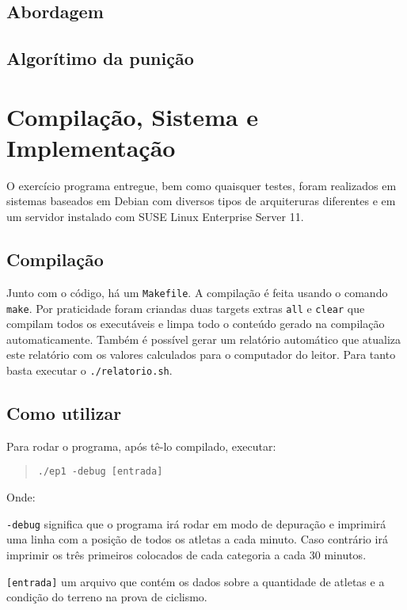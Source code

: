 \documentclass[12pt,a4paper]{article}
\begin{document}
\subsection{Abordagem}

\subsection{Algorítimo da punição}

\pagebreak
\section{Compilação, Sistema e Implementação}
O exercício programa entregue, bem como quaisquer testes, foram realizados em sistemas baseados em Debian com diversos tipos de arquiteruras diferentes e em um servidor instalado com SUSE Linux Enterprise Server 11.

\subsection{Compilação}
Junto com o código, há um \verb+Makefile+. A compilação é feita usando o 
comando \verb+make+. Por praticidade foram criandas duas targets extras \verb+all+ e \verb+clear+ que compilam todos os executáveis e limpa todo o conteúdo gerado na compilação automaticamente. Também é possível gerar um relatório automático que atualiza este relatório com os valores calculados para o computador do leitor. Para tanto basta executar o \verb+./relatorio.sh+.

\subsection{Como utilizar}
Para rodar o programa, após tê-lo compilado, executar:
\begin{quote}
\begin{verbatim}
./ep1 -debug [entrada]
\end{verbatim}
\end{quote}

Onde:

\verb+-debug+ significa que o programa irá rodar em modo de depuração e imprimirá uma linha com a posição de todos os atletas a cada minuto. Caso contrário irá imprimir os três primeiros colocados de cada categoria a cada 30 minutos.

\verb+[entrada]+ um arquivo que contém os dados sobre a quantidade de atletas e a condição do terreno na prova de ciclismo.
\end{document}
